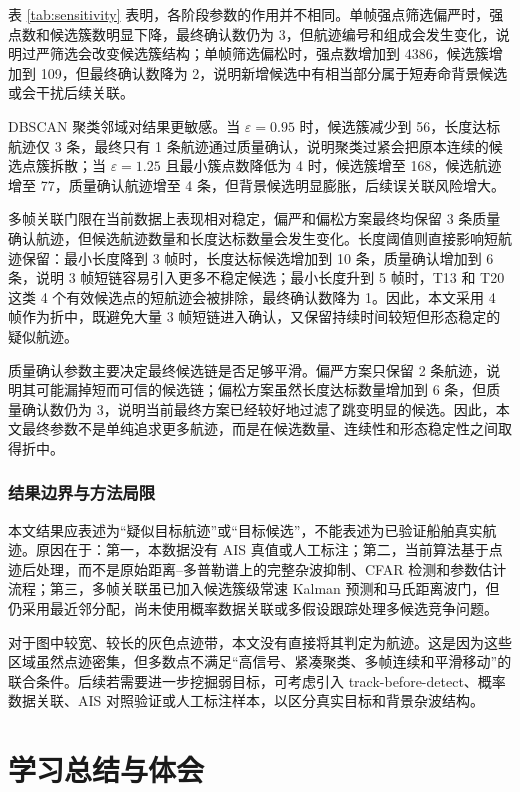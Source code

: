 \documentclass[UTF8,a4paper,12pt]{ctexart}
\numberwithin{figure}{section}
\numberwithin{table}{section}
\begin{document}
表 \ref{tab:sensitivity} 表明，各阶段参数的作用并不相同。单帧强点筛选偏严时，强点数和候选簇数明显下降，最终确认数仍为 3，但航迹编号和组成会发生变化，说明过严筛选会改变候选簇结构；单帧筛选偏松时，强点数增加到 4386，候选簇增加到 109，但最终确认数降为 2，说明新增候选中有相当部分属于短寿命背景候选或会干扰后续关联。

DBSCAN 聚类邻域对结果更敏感。当 \(\varepsilon=0.95\) 时，候选簇减少到 56，长度达标航迹仅 3 条，最终只有 1 条航迹通过质量确认，说明聚类过紧会把原本连续的候选点簇拆散；当 \(\varepsilon=1.25\) 且最小簇点数降低为 4 时，候选簇增至 168，候选航迹增至 77，质量确认航迹增至 4 条，但背景候选明显膨胀，后续误关联风险增大。

多帧关联门限在当前数据上表现相对稳定，偏严和偏松方案最终均保留 3 条质量确认航迹，但候选航迹数量和长度达标数量会发生变化。长度阈值则直接影响短航迹保留：最小长度降到 3 帧时，长度达标候选增加到 10 条，质量确认增加到 6 条，说明 3 帧短链容易引入更多不稳定候选；最小长度升到 5 帧时，T13 和 T20 这类 4 个有效候选点的短航迹会被排除，最终确认数降为 1。因此，本文采用 4 帧作为折中，既避免大量 3 帧短链进入确认，又保留持续时间较短但形态稳定的疑似航迹。

质量确认参数主要决定最终候选链是否足够平滑。偏严方案只保留 2 条航迹，说明其可能漏掉短而可信的候选链；偏松方案虽然长度达标数量增加到 6 条，但质量确认数仍为 3，说明当前最终方案已经较好地过滤了跳变明显的候选。因此，本文最终参数不是单纯追求更多航迹，而是在候选数量、连续性和形态稳定性之间取得折中。

\subsubsection{结果边界与方法局限}

本文结果应表述为“疑似目标航迹”或“目标候选”，不能表述为已验证船舶真实航迹。原因在于：第一，本数据没有 AIS 真值或人工标注；第二，当前算法基于点迹后处理，而不是原始距离--多普勒谱上的完整杂波抑制、CFAR 检测和参数估计流程；第三，多帧关联虽已加入候选簇级常速 Kalman 预测和马氏距离波门，但仍采用最近邻分配，尚未使用概率数据关联或多假设跟踪处理多候选竞争问题。

对于图中较宽、较长的灰色点迹带，本文没有直接将其判定为航迹。这是因为这些区域虽然点迹密集，但多数点不满足“高信号、紧凑聚类、多帧连续和平滑移动”的联合条件。后续若需要进一步挖掘弱目标，可考虑引入 track-before-detect、概率数据关联、AIS 对照验证或人工标注样本，以区分真实目标和背景杂波结构。

\section{学习总结与体会}
\end{document}
